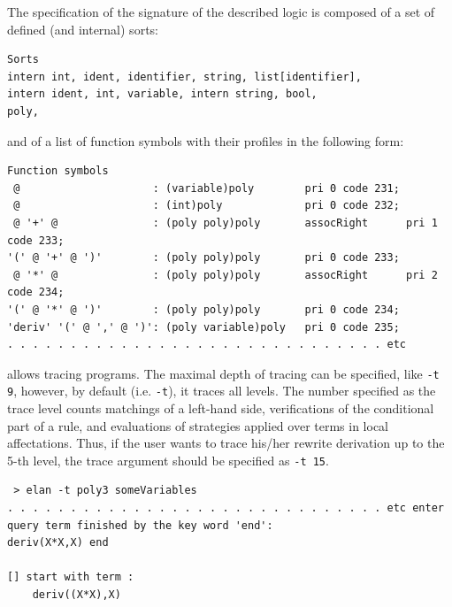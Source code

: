 \begin{description}
The specification of the signature of the described logic 
is composed of a set of defined (and internal) sorts:
{\footnotesize\begin{verbatim}
Sorts
intern int, ident, identifier, string, list[identifier], 
intern ident, int, variable, intern string, bool, 
poly, 
\end{verbatim} }
and of a list of function symbols with their profiles in the following form:
{\footnotesize\begin{verbatim}
Function symbols
 @                     : (variable)poly        pri 0 code 231;
 @                     : (int)poly             pri 0 code 232;
 @ '+' @               : (poly poly)poly       assocRight      pri 1 code 233;
'(' @ '+' @ ')'        : (poly poly)poly       pri 0 code 233;
 @ '*' @               : (poly poly)poly       assocRight      pri 2 code 234;
'(' @ '*' @ ')'        : (poly poly)poly       pri 0 code 234;
'deriv' '(' @ ',' @ ')': (poly variable)poly   pri 0 code 235;
. . . . . . . . . . . . . . . . . . . . . . . . . . . . . . etc
\end{verbatim} }
 \item[{\tt -t} (or, {\tt --trace})] allows tracing \elan{}
programs.  The maximal depth of tracing can be specified, 
like \verb|-t 9|, however, by default (i.e. \verb|-t|), it traces all levels.  The
number specified as the trace level counts matchings of a left-hand
side, verifications of the conditional part of a rule, and evaluations
of strategies applied over terms in local affectations. Thus, if the
user wants to trace his/her rewrite derivation up to the 5-th level, the
trace argument should be specified as \verb|-t 15|.
%
{\footnotesize\begin{verbatim} > elan -t poly3 someVariables
. . . . . . . . . . . . . . . . . . . . . . . . . . . . . . etc enter
query term finished by the key word 'end':
deriv(X*X,X) end

[] start with term :
    deriv((X*X),X)


\end{verbatim}}
\end{description}
